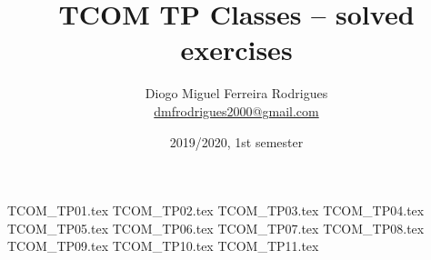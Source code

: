 \documentclass{tcom}
\title{TCOM TP Classes -- solved exercises}
\author{Diogo Miguel Ferreira Rodrigues \\ \href{mailto:dmfrodrigues2000@gmail.com}{dmfrodrigues2000@gmail.com}}
\date{2019/2020, 1st semester}
\begin{document}
\maketitle
\tableofcontents
{TCOM_TP01.tex}
{TCOM_TP02.tex}
{TCOM_TP03.tex}
{TCOM_TP04.tex}
{TCOM_TP05.tex}
{TCOM_TP06.tex}
{TCOM_TP07.tex}
{TCOM_TP08.tex}
{TCOM_TP09.tex}
{TCOM_TP10.tex}
{TCOM_TP11.tex}
\end{document}

